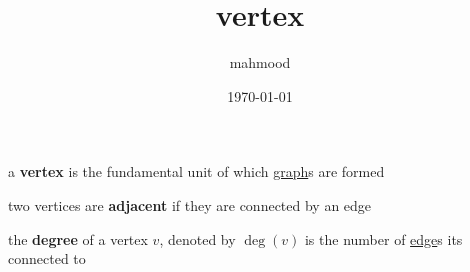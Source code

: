 \documentclass[a4paper,12pt]{article}
\author{mahmood}
\date{\today}
\title{vertex}
\begin{document}
\maketitle
\begin{definition}
a \textbf{vertex} is the fundamental unit of which \href{20230314001051-graph.org}{graph}s are formed\\
\begin{characteristic}
two vertices are \textbf{adjacent} if they are connected by an edge\\
\end{characteristic}
\begin{characteristic}
the \textbf{degree} of a vertex \(v\), denoted by \(\deg(v)\) is the number of \href{20230314001632-edge.org}{edge}s its connected to\\
\end{characteristic}
\end{definition}
\end{document}
